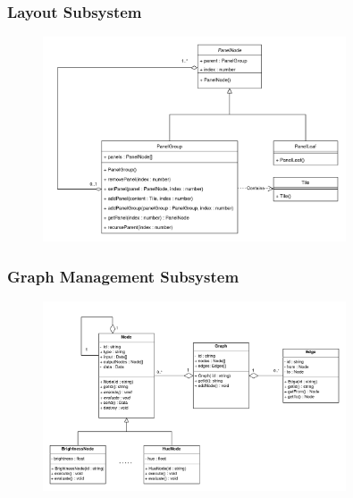 \documentclass[11pt,a4paper]{article}
\begin{document}
\subsubsection*{Layout Subsystem}
\begin{figure}[htbp]
    \centering
      \includegraphics[width=0.8\textwidth]{../diagramPng/Layout-Subsystem.png}
\end{figure}

\pagebreak
{}
\subsubsection*{Graph Management Subsystem}
\begin{figure}[htbp]
  \centering
  \includegraphics[width=0.8\textwidth]{../diagramPng/Graph-Subsystem.png}
\end{figure}

\pagebreak

\end{document}
